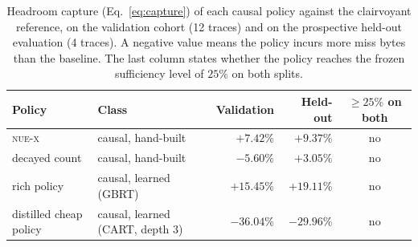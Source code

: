 \begin{table}[t]
\centering
\caption{Headroom capture (Eq.~\eqref{eq:capture}) of each causal policy against the clairvoyant reference, on the validation cohort (12 traces) and on the prospective held-out evaluation (4 traces). A negative value means the policy incurs more miss bytes than the baseline. The last column states whether the policy reaches the frozen sufficiency level of $25\%$ on both splits.}
\label{tab:results}
\small
\begin{tabular}{llrrc}
\toprule
Policy & Class & Validation & Held-out & $\ge 25\%$ on both \\
\midrule
\textsc{nue-x} & causal, hand-built & $+7.42\%$ & $+9.37\%$ & no \\
decayed count & causal, hand-built & $-5.60\%$ & $+3.05\%$ & no \\
rich policy & causal, learned (GBRT) & $+15.45\%$ & $+19.11\%$ & no \\
distilled cheap policy & causal, learned (CART, depth 3) & $-36.04\%$ & $-29.96\%$ & no \\
\bottomrule
\end{tabular}
\end{table}
